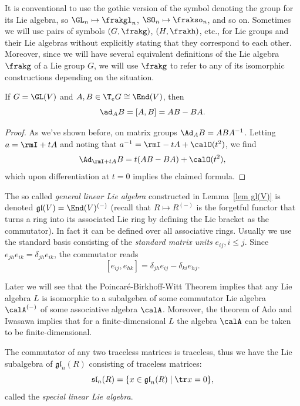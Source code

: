 \begin{rem}
    It is conventional to use the gothic version of the symbol denoting the group for its Lie algebra, so $\GL_n\mapsto \frakgl_n$, $\SO_n\mapsto \frakso_n$, and so on. Sometimes we will use pairs of symbols $(G,\frakg)$, $(H,\frakh)$, etc., for Lie groups and their Lie algebras without explicitly stating that they correspond to each other. Moreover, since we will have several equivalent definitions of the Lie algebra $\frakg$ of a Lie group $G$, we will use $\frakg$ to refer to any of its isomorphic constructions depending on the situation.
\end{rem}

\begin{lem}\label{lem gl(V)}
    If $G=\GL(V)$ and $A,B\in \T_e G\cong \End(V)$, then 
    \[\ad_A B=[A,B]=AB-BA.\]
\end{lem}
\begin{proof}
    As we've shown before, on matrix groups $\Ad_A B=ABA^{-1}$. Letting $a=\rmI+tA$ and noting that $a^{-1}=\rmI-tA+\calO(t^2)$, we find
    \[\Ad_{\rmI+tA} B=t(AB-BA)+\calO(t^2),\]
    which upon differentiation at $t=0$ implies the claimed formula.
\end{proof}


\begin{example}[$\mathfrak{gl}_n(R)$]
    The so called \emph{general linear Lie algebra} constructed in Lemma~\ref{lem gl(V)} is denoted $\mathfrak{gl}(V)=\End(V)^{(-)}$ (recall that $R\mapsto R^{(-)}$ is the forgetful functor that turns a ring into its associated Lie ring by defining the Lie bracket as the commutator). In fact it can be defined over all associative rings. Usually we use the standard basis consisting of the \emph{standard matrix units} $e_{ij},i\leq j$. Since $e_{jh}e_{ik}=\delta_{jh}e_{ik}$, the commutator reads
    \[[e_{ij},e_{hk}]=\delta_{jh}e_{ij}-\delta_{ki}e_{hj}.\]

    Later we will see that the Poincar\'e-Birkhoff-Witt Theorem implies that any Lie algebra $L$ is isomorphic to a subalgebra of some commutator Lie algebra $\calA^{(-)}$ of some associative algebra $\calA$. Moreover, the theorem of Ado and Iwasawa implies that for a finite-dimensional $L$ the algebra $\calA$ can be taken to be finite-dimensional.
\end{example}

\begin{example}[$\mathfrak{sl}_n(R)$]
    The commutator of any two traceless matrices is traceless, thus we have the Lie subalgebra of $\mathfrak{gl}_n(R)$ consisting of traceless matrices:
    \[\mathfrak{sl}_n(R)=\{x\in \mathfrak{gl}_n(R)\mid \tr x=0\},\]
    called the \emph{special linear Lie algebra}.
\end{example}

